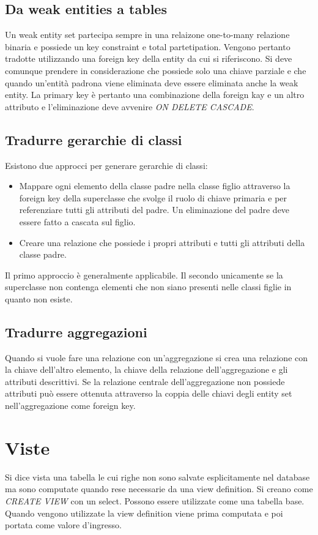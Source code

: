 \subsection{Da weak entities a tables}
Un weak entity set partecipa sempre in una relaizone one-to-many relazione binaria e possiede un key constraint e total partetipation. Vengono pertanto tradotte utilizzando una foreign key della entity da cui
si riferiscono. Si deve comunque prendere in considerazione che possiede solo una chiave parziale e che quando un'entit\`a padrona viene eliminata deve essere eliminata anche la weak entity. La primary
key \`e pertanto una combinazione della foreign kay e un altro attributo e l'eliminazione deve avvenire \emph{ON DELETE CASCADE}.
\subsection{Tradurre gerarchie di classi}
Esistono due approcci per generare gerarchie di classi: 
\begin{itemize}
\item Mappare ogni elemento della classe padre nella classe figlio attraverso la foreign key della superclasse che svolge il ruolo di chiave primaria e per referenziare tutti gli attributi del padre. Un eliminazione
del padre deve essere fatto a cascata sul figlio.
\item Creare una relazione che possiede i propri attributi e tutti gli attributi della classe padre.
\end{itemize}
Il primo approccio \`e generalmente applicabile. Il secondo unicamente se la superclasse non contenga elementi che non siano presenti nelle classi figlie in quanto non esiste.
\subsection{Tradurre aggregazioni}
Quando si vuole fare una relazione con un'aggregazione si crea una relazione con la chiave dell'altro elemento, la chiave della relazione dell'aggregazione e gli attributi descrittivi. Se la relazione centrale 
dell'aggregazione non possiede attributi pu\`o essere ottenuta attraverso la coppia delle chiavi degli entity set nell'aggregazione come foreign key. 
\section{Viste}
Si dice vista una tabella le cui righe non sono salvate esplicitamente nel database ma sono computate quando rese necessarie da una view definition. Si creano come \emph{CREATE VIEW} con un select.
Possono essere utilizzate come una tabella base. Quando vengono utilizzate la view definition viene prima computata e poi portata come valore d'ingresso.
